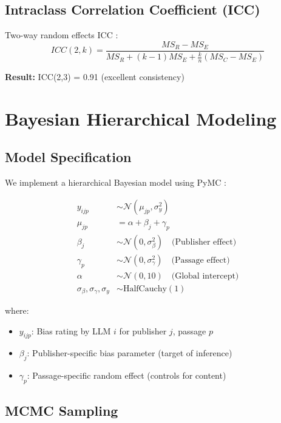\documentclass[11pt,a4paper]{article}
\begin{document}
\subsection{Intraclass Correlation Coefficient (ICC)}

Two-way random effects ICC \citep{shrout1979icc}:
\begin{equation}
ICC(2,k) = \frac{MS_R - MS_E}{MS_R + (k-1)MS_E + \frac{k}{n}(MS_C - MS_E)}
\end{equation}

\textbf{Result:} ICC(2,3) = 0.91 (excellent consistency)

\section{Bayesian Hierarchical Modeling}

\subsection{Model Specification}

We implement a hierarchical Bayesian model using PyMC \citep{salvatier2016pymc}:

\begin{align}
y_{ijp} &\sim \mathcal{N}(\mu_{jp}, \sigma_y^2) \\
\mu_{jp} &= \alpha + \beta_j + \gamma_p \\
\beta_j &\sim \mathcal{N}(0, \sigma_\beta^2) \quad \text{(Publisher effect)} \\
\gamma_p &\sim \mathcal{N}(0, \sigma_\gamma^2) \quad \text{(Passage effect)} \\
\alpha &\sim \mathcal{N}(0, 10) \quad \text{(Global intercept)} \\
\sigma_\beta, \sigma_\gamma, \sigma_y &\sim \text{HalfCauchy}(1)
\end{align}

where:
\begin{itemize}
    \item $y_{ijp}$: Bias rating by LLM $i$ for publisher $j$, passage $p$
    \item $\beta_j$: Publisher-specific bias parameter (target of inference)
    \item $\gamma_p$: Passage-specific random effect (controls for content)
\end{itemize}

\subsection{MCMC Sampling}
\end{document}
